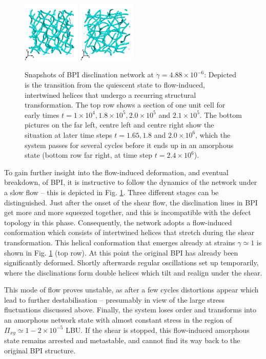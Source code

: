 \documentclass[8.5pt,twoside,twocolumn]{article}
\newcommand{\e}[1]{\times10^{#1}}
\begin{document}
\begin{figure}[htpb]
\includegraphics[width=0.245\textwidth]{disc-xy-2000k_run1115r.png}
\includegraphics[width=0.245\textwidth]{disc-xy-2400k_run1115r.png}
\caption{Snapshots of BPI disclination network at $\dot{\gamma}=4.88\e{-6}$: 
Depicted is the transition from the quiescent state to flow-induced, intertwined 
helices that undergo a recurring structural transformation. The top row
shows a section of one unit cell for early times 
$t=1\e{4}, 1.8\e{5}, 2.0\e{5}$ and $2.1\e{5}$. The bottom 
pictures on the far left, centre left and centre right 
show the situation at later time steps $t=1.65, 1.8$ and $2.0\e{6}$,
which the system passes for several cycles before it ends up in
an amorphous state (bottom row far right, at time step $t=2.4\e{6}$).}
\label{bp1-1-disc}
\end{figure}

To gain further insight into the flow-induced deformation, and eventual
breakdown, of BPI, it is instructive to follow the dynamics of 
the network under a slow flow -- this is depicted in Fig. \ref{bp1-1-disc}.
Three different stages can be distinguished. 
Just after the onset of the shear flow, the disclination lines 
in BPI get more and more squeezed together, and this is incompatible with
the defect topology in this phase.
Consequently, the network adopts a flow-induced conformation which consists 
of intertwined helices that stretch during the shear transformation.
This helical conformation that emerges already at strains $\gamma\simeq1$ 
is shown in Fig. \ref{bp1-1-disc} (top row).
At this point the original BPI has already been significantly deformed.
Shortly afterwards regular oscillations set up temporarily,
where the disclinations form double helices which tilt and realign under the shear.

This mode of flow proves unstable, as after a few cycles 
distortions appear which lead to further destabilisation -- presumably in
view of the large stress fluctuations discussed above. 
Finally, the system loses order and 
transforms into an amorphous network state with almost constant
stress in the region of $\Pi_{xy}\simeq 1-2\e{-5}$ LBU.
If the shear is stopped, this flow-induced amorphous state
remains arrested and metastable, and cannot
find its way back to the original BPI structure.
\end{document}
